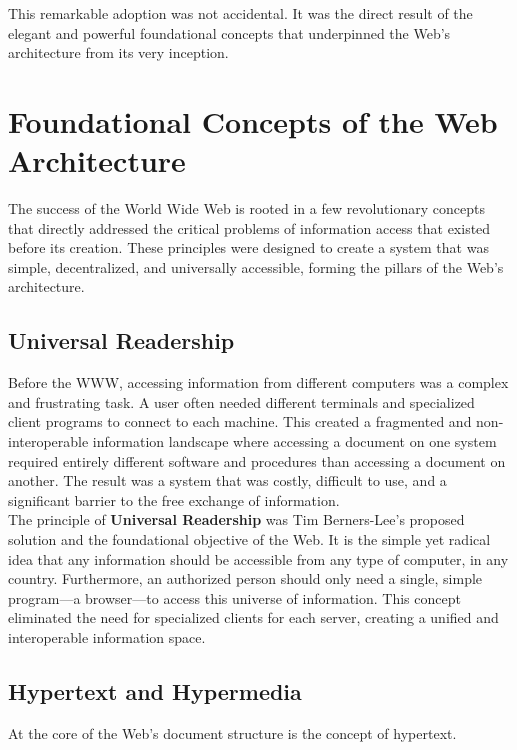 \documentclass{scrbook}
\begin{document}
This remarkable adoption was not accidental. It was the direct result of the elegant and powerful foundational concepts that underpinned the Web's architecture from its very inception.

\chapter{Foundational Concepts of the Web Architecture}

The success of the World Wide Web is rooted in a few revolutionary concepts that directly addressed the critical problems of information access that existed before its creation. These principles were designed to create a system that was simple, decentralized, and universally accessible, forming the pillars of the Web's architecture.

\section{Universal Readership}

Before the WWW, accessing information from different computers was a complex and frustrating task. A user often needed different terminals and specialized client programs to connect to each machine. This created a fragmented and non-interoperable information landscape where accessing a document on one system required entirely different software and procedures than accessing a document on another. The result was a system that was costly, difficult to use, and a significant barrier to the free exchange of information. \\

The principle of \textbf{Universal Readership} was Tim Berners-Lee's proposed solution and the foundational objective of the Web. It is the simple yet radical idea that any information should be accessible from any type of computer, in any country. Furthermore, an authorized person should only need a single, simple program—a browser—to access this universe of information. This concept eliminated the need for specialized clients for each server, creating a unified and interoperable information space.

\section{Hypertext and Hypermedia}

At the core of the Web's document structure is the concept of hypertext. \\
\end{document}
